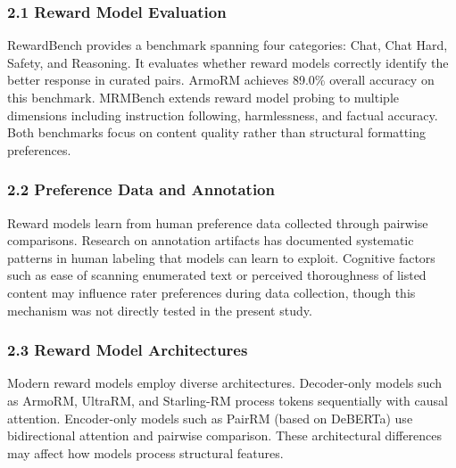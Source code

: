 
\subsubsection{2.1 Reward Model Evaluation}

RewardBench provides a benchmark spanning four categories: Chat, Chat Hard, Safety, and Reasoning. It evaluates whether reward models correctly identify the better response in curated pairs. ArmoRM achieves 89.0\% overall accuracy on this benchmark. MRMBench extends reward model probing to multiple dimensions including instruction following, harmlessness, and factual accuracy. Both benchmarks focus on content quality rather than structural formatting preferences.

\subsubsection{2.2 Preference Data and Annotation}

Reward models learn from human preference data collected through pairwise comparisons. Research on annotation artifacts has documented systematic patterns in human labeling that models can learn to exploit. Cognitive factors such as ease of scanning enumerated text or perceived thoroughness of listed content may influence rater preferences during data collection, though this mechanism was not directly tested in the present study.

\subsubsection{2.3 Reward Model Architectures}

Modern reward models employ diverse architectures. Decoder-only models such as ArmoRM, UltraRM, and Starling-RM process tokens sequentially with causal attention. Encoder-only models such as PairRM (based on DeBERTa) use bidirectional attention and pairwise comparison. These architectural differences may affect how models process structural features.
